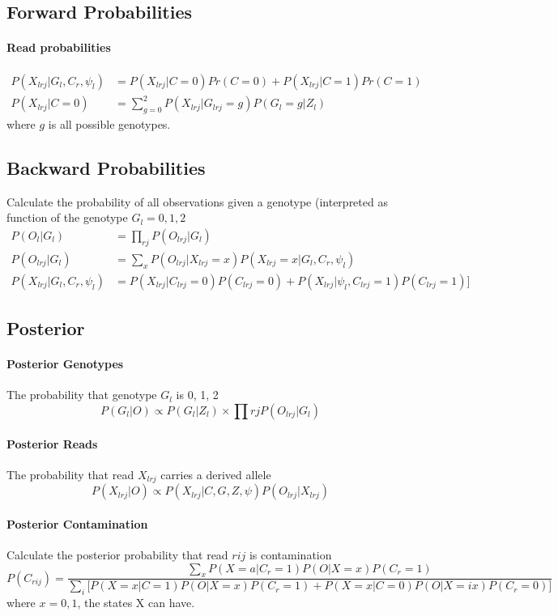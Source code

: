 \documentclass[10pt,a4paper]{article}
\begin{document}
\subsection*{Forward Probabilities}
\paragraph{Read probabilities}
\begin{align*}
 P(X_{lrj} | G_l, C_r, \psi_l) &=  P(X_{lrj} | C=0) Pr( C=0) + P(X_{lrj} | C=1) Pr(C=1) \\
 P(X_{lrj} | C=0) &= \sum_{g=0}^2 P(X_{lrj} | G_{lrj}=g)P(G_l=g | Z_l) 
\end{align*}
where $g$ is all possible genotypes.

\subsection*{Backward Probabilities}
Calculate the probability of all observations given a genotype (interpreted as function of the genotype $G_l = 0,1,2$
\begin{align*}
P(O_{l} | G_l) &= \prod_{rj} P(O_{lrj} | G_l)\\
P(O_{lrj} | G_l) &= \sum_x P(O_{lrj}|X_{lrj}=x)  P(X_{lrj}=x | G_l, C_r, \psi_l)\\
P(X_{lrj} | G_l, C_r, \psi_l) &= P(X_{lrj} | C_{lrj}=0)P(C_{lrj}=0)  + P(X_{lrj} | \psi_l, C_{lrj}=1)P(C_{lrj}=1)]
\end{align*}

\subsection*{Posterior}
\paragraph{Posterior Genotypes}
The probability that genotype $G_l$ is 0, 1, 2
$$P(G_l | O) \propto P(G_l | Z_l) \times \prod{rj} P(O_{lrj} | G_l)$$

\paragraph{Posterior Reads}
The probability that read $X_{lrj}$ carries a derived allele
$$P(X_{lrj} | O) \propto P(X_{lrj} | C, G, Z, \psi) P(O_{lrj} | X_{lrj})$$
\paragraph{Posterior Contamination}
Calculate the posterior probability that read $rij$ is contamination
$$P(C_{rij})  = \frac{\sum_x P(X=a|C_r=1) P(O|X=x) P(C_r=1)}{\sum_i \big[ P(X=x|C=1) P(O|X=x)P(C_r=1) +  P(X=x|C=0) P(O|X=ix)P(C_r=0)\big]}$$
where $x=0,1$, the states X can have.
\end{document}

